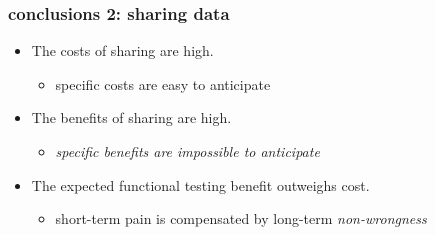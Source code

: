 \documentclass[pdftex]{beamer}
\begin{document}
\begin{frame}
  \frametitle{conclusions 2: sharing data}
  \begin{itemize}
  \item The costs of sharing are high.
    \begin{itemize}
    \item specific costs are easy to anticipate
    \end{itemize}
  \item The benefits of sharing are high.
    \begin{itemize}
    \item \emph{specific benefits are impossible to anticipate}
    \end{itemize}
  \item The expected functional testing benefit outweighs cost.
    \begin{itemize}
    \item short-term pain is compensated by long-term \emph{non-wrongness}
    \end{itemize}
  \end{itemize}
\end{frame}
\end{document}
